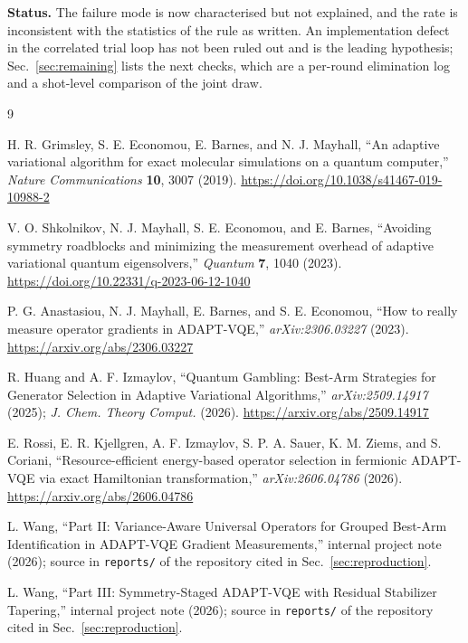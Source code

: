 \documentclass[10pt]{article}
\begin{document}
\textbf{Status.} The failure mode is now characterised but not explained, and the
rate is inconsistent with the statistics of the rule as written. An
implementation defect in the correlated trial loop has not been ruled out and is
the leading hypothesis; Sec.~\ref{sec:remaining} lists the next checks, which are
a per-round elimination log and a shot-level comparison of the joint draw.

\begin{thebibliography}{9}
\setlength{\itemsep}{1pt}

H. R. Grimsley, S. E. Economou, E. Barnes, and N. J. Mayhall,
``An adaptive variational algorithm for exact molecular simulations on a quantum computer,''
\emph{Nature Communications} \textbf{10}, 3007 (2019).
\url{https://doi.org/10.1038/s41467-019-10988-2}

V. O. Shkolnikov, N. J. Mayhall, S. E. Economou, and E. Barnes,
``Avoiding symmetry roadblocks and minimizing the measurement overhead of adaptive variational quantum eigensolvers,''
\emph{Quantum} \textbf{7}, 1040 (2023).
\url{https://doi.org/10.22331/q-2023-06-12-1040}

P. G. Anastasiou, N. J. Mayhall, E. Barnes, and S. E. Economou,
``How to really measure operator gradients in ADAPT-VQE,''
\emph{arXiv:2306.03227} (2023).
\url{https://arxiv.org/abs/2306.03227}

R. Huang and A. F. Izmaylov,
``Quantum Gambling: Best-Arm Strategies for Generator Selection in Adaptive Variational Algorithms,''
\emph{arXiv:2509.14917} (2025); \emph{J. Chem. Theory Comput.} (2026).
\url{https://arxiv.org/abs/2509.14917}

E. Rossi, E. R. Kjellgren, A. F. Izmaylov, S. P. A. Sauer, K. M. Ziems, and S. Coriani,
``Resource-efficient energy-based operator selection in fermionic ADAPT-VQE via exact Hamiltonian transformation,''
\emph{arXiv:2606.04786} (2026).
\url{https://arxiv.org/abs/2606.04786}

L. Wang,
``Part II: Variance-Aware Universal Operators for Grouped Best-Arm Identification in ADAPT-VQE Gradient Measurements,''
internal project note (2026); source in \texttt{reports/} of the repository cited in Sec.~\ref{sec:reproduction}.

L. Wang,
``Part III: Symmetry-Staged ADAPT-VQE with Residual Stabilizer Tapering,''
internal project note (2026); source in \texttt{reports/} of the repository cited in Sec.~\ref{sec:reproduction}.

\end{thebibliography}
\end{document}

